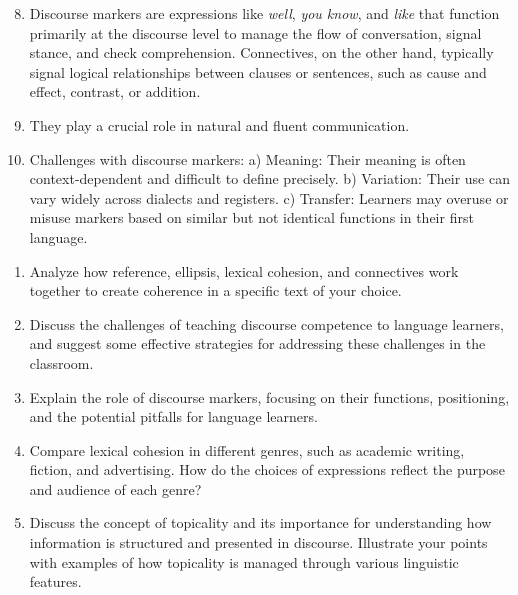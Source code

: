 \begin{tcolorbox}[title=Answer Key 8--10, colback=white, colframe=blue!75!black, fonttitle=\bfseries]

\begin{enumerate}[noitemsep]\setcounter{enumi}{7}
    
    \item Discourse markers are expressions like \textit{well}, \textit{you know}, and \textit{like} that function primarily at the discourse level to manage the flow of conversation, signal stance, and check comprehension. Connectives, on the other hand, typically signal logical relationships between clauses or sentences, such as cause and effect, contrast, or addition.
    \item They play a crucial role in natural and fluent communication.
    \item Challenges with discourse markers: a) Meaning: Their meaning is often context-dependent and difficult to define precisely. b) Variation: Their use can vary widely across dialects and registers. c) Transfer: Learners may overuse or misuse markers based on similar but not identical functions in their first language.
\end{enumerate}
\end{tcolorbox}
\begin{tcolorbox}[title=Essay questions, colback=white, colframe=blue!75!black, fonttitle=\bfseries]
\begin{enumerate}[noitemsep]
    \item Analyze how reference, ellipsis, lexical cohesion, and connectives work together to create coherence in a specific text of your choice.
    \item Discuss the challenges of teaching discourse competence to language learners, and suggest some effective strategies for addressing these challenges in the classroom.
    \item Explain the role of discourse markers, focusing on their functions, positioning, and the potential pitfalls for language learners.
    \item Compare lexical cohesion in different genres, such as academic writing, fiction, and advertising. How do the choices of expressions reflect the purpose and audience of each genre?
    \item Discuss the concept of topicality and its importance for understanding how information is structured and presented in discourse. Illustrate your points with examples of how topicality is managed through various linguistic features.
\end{enumerate}
\end{tcolorbox}
